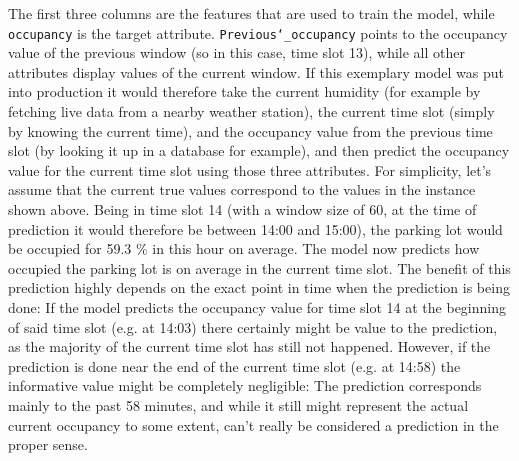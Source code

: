 The first three columns are the features that are used to train the model, while \texttt{occupancy} is the target attribute. \texttt{Previous\char`_occupancy} points to the occupancy value of the previous window (so in this case, time slot 13), while all other attributes display values of the current window. If this exemplary model was put into production it would therefore take the current humidity (for example by fetching live data from a nearby weather station), the current time slot (simply by knowing the current time), and the occupancy value from the previous time slot (by looking it up in a database for example), and then predict the occupancy value for the current time slot using those three attributes. For simplicity, let’s assume that the current true values correspond to the values in the instance shown above. Being in time slot 14 (with a window size of 60, at the time of prediction it would therefore be between 14:00 and 15:00), the parking lot would be occupied for 59.3 \% in this hour on average. The model now predicts how occupied the parking lot is on average in the current time slot. The benefit of this prediction highly depends on the exact point in time when the prediction is being done: If the model predicts the occupancy value for time slot 14 at the beginning of said time slot (e.g. at 14:03) there certainly might be value to the prediction, as the majority of the current time slot has still not happened. However, if the prediction is done near the end of the current time slot (e.g. at 14:58) the informative value might be completely negligible: The prediction corresponds mainly to the past 58 minutes, and while it still might represent the actual current occupancy to some extent, can’t really be considered a prediction in the proper sense. 

